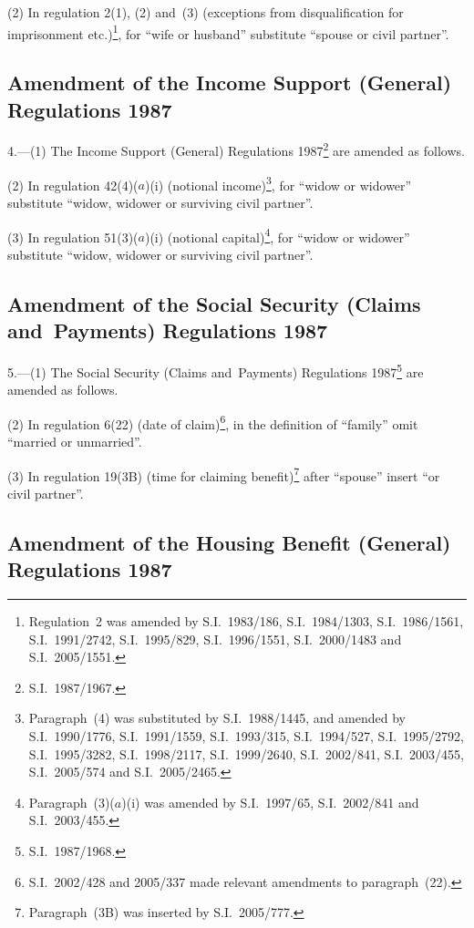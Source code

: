 \documentclass[12pt,a4paper]{article}
\begin{document}
(2) In regulation 2(1), (2) and~(3) (exceptions from disqualification for imprisonment etc.)\footnote{Regulation~2 was amended by S.I.~1983/186, S.I.~1984/1303, S.I.~1986/1561, S.I.~1991/2742, S.I.\ 1995/829, S.I.~1996/1551, S.I.~2000/1483 and S.I.~2005/1551.}, for “wife or husband” substitute “spouse or civil partner”.

\subsection[4. Amendment of the Income Support (General) Regulations 1987]{Amendment of the Income Support (General) Regulations 1987}

4.---(1)  The Income Support (General) Regulations 1987\footnote{S.I.~1987/1967.} are amended as follows.

(2) In regulation 42(4)($a$)(i) (notional income)\footnote{Paragraph~(4) was substituted by S.I.~1988/1445, and amended by S.I.~1990/1776, S.I.~1991/1559, S.I.~1993/315, S.I.~1994/527, S.I.~1995/2792, S.I.~1995/3282, S.I.~1998/2117, S.I.~1999/2640, S.I.~2002/841, S.I.~2003/455, S.I.~2005/574 and S.I.~2005/2465.}, for “widow or widower” substitute “widow, widower or surviving civil partner”.

(3) In regulation 51(3)($a$)(i) (notional capital)\footnote{Paragraph~(3)($a$)(i) was amended by S.I.~1997/65, S.I.~2002/841 and S.I.~2003/455.}, for “widow or widower” substitute “widow, widower or surviving civil partner”.

\subsection[5. Amendment of the Social Security (Claims and~Payments) Regulations 1987]{Amendment of the Social Security (Claims and~Payments) Regulations 1987}

5.---(1)  The Social Security (Claims and~Payments) Regulations 1987\footnote{S.I.~1987/1968.} are amended as follows.

(2) In regulation 6(22) (date of claim)\footnote{S.I.~2002/428 and 2005/337 made relevant amendments to paragraph~(22).}, in the definition of “family” omit “married or unmarried”.

(3) In regulation 19(3B) (time for claiming benefit)\footnote{Paragraph~(3B) was inserted by S.I.~2005/777.} after “spouse” insert “or civil partner”.

\subsection[6. Amendment of the Housing Benefit (General) Regulations 1987]{Amendment of the Housing Benefit (General) Regulations 1987}
\end{document}
